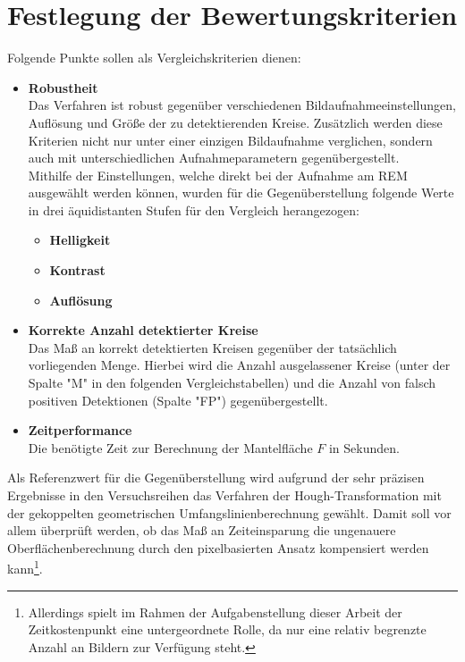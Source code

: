 \documentclass[accentcolor=tud1c, 11pt, toc=bib, toc=listof, captions=abovetable, parskip=half]{tudreport}
\begin{document}
\section{Festlegung der Bewertungskriterien}
Folgende Punkte sollen als  Vergleichskriterien dienen:
\begin{itemize}
\item \textbf{Robustheit}\\ 
Das Verfahren ist robust gegenüber verschiedenen Bildaufnahmeeinstellungen, Auflösung und Größe der zu detektierenden Kreise. Zusätzlich werden diese Kriterien nicht nur unter einer einzigen Bildaufnahme verglichen, sondern auch mit unterschiedlichen Aufnahmeparametern gegenübergestellt.\\
Mithilfe der Einstellungen, welche direkt bei der Aufnahme am REM ausgewählt werden können, wurden für die Gegenüberstellung folgende Werte in drei äquidistanten Stufen für den Vergleich herangezogen:
\begin{itemize}
\item \textbf{Helligkeit}\\ 
\item \textbf{Kontrast}\\
\item \textbf{Auflösung} \\
\end{itemize}
\item \textbf{Korrekte Anzahl detektierter Kreise}\\
Das Maß an korrekt detektierten Kreisen gegenüber der tatsächlich vorliegenden Menge. Hierbei wird die Anzahl ausgelassener Kreise (unter der Spalte "M" in den folgenden Vergleichstabellen) und die Anzahl von falsch positiven Detektionen (Spalte "FP") gegenübergestellt. 
\item \textbf{Zeitperformance} \\
Die benötigte Zeit zur Berechnung der Mantelfläche $F$ in Sekunden.
\end{itemize}

Als Referenzwert für die Gegenüberstellung wird aufgrund der sehr präzisen Ergebnisse in den Versuchsreihen das Verfahren der Hough-Transformation mit der gekoppelten geometrischen Umfangslinienberechnung gewählt. Damit soll vor allem überprüft werden, ob das Maß an Zeiteinsparung die ungenauere Oberflächenberechnung durch den pixelbasierten Ansatz kompensiert werden kann\footnote{Allerdings spielt im Rahmen der Aufgabenstellung dieser Arbeit der Zeitkostenpunkt eine untergeordnete Rolle, da nur eine relativ begrenzte Anzahl an Bildern zur Verfügung steht.}.
\end{document}
